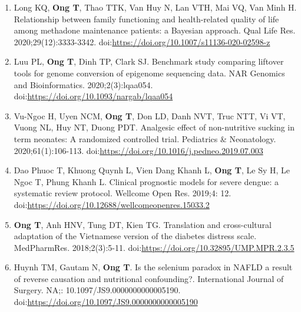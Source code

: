 \documentclass[
  12pt,
  a4paper,
]{article}
\begin{document}
\begin{enumerate}
  doi:\url{https://doi.org/10.2147/DMSO.S297315}
\item
  Long KQ, \textbf{Ong T}, Thao TTK, Van Huy N, Lan VTH, Mai VQ, Van
  Minh H. Relationship between family functioning and health-related
  quality of life among methadone maintenance patients: a Bayesian
  approach. Qual Life Res. 2020;29(12):3333-3342.
  doi:\url{https://doi.org/10.1007/s11136-020-02598-z}
\item
  Luu PL, \textbf{Ong T}, Dinh TP, Clark SJ. Benchmark study comparing
  liftover tools for genome conversion of epigenome sequencing data. NAR
  Genomics and Bioinformatics. 2020;2(3):lqaa054.
  doi:\url{https://doi.org/10.1093/nargab/lqaa054}
\item
  Vu-Ngoc H, Uyen NCM, \textbf{Ong T}, Don LD, Danh NVT, Truc NTT, Vi
  VT, Vuong NL, Huy NT, Duong PDT. Analgesic effect of non-nutritive
  sucking in term neonates: A randomized controlled trial. Pediatrics \&
  Neonatology. 2020;61(1):106-113.
  doi:\url{https://doi.org/10.1016/j.pedneo.2019.07.003}
\item
  Dao Phuoc T, Khuong Quynh L, Vien Dang Khanh L, \textbf{Ong T}, Le Sy
  H, Le Ngoc T, Phung Khanh L. Clinical prognostic models for severe
  dengue: a systematic review protocol. Wellcome Open Res. 2019;4: 12.
  doi:\url{https://doi.org/10.12688/wellcomeopenres.15033.2}
\item
  \textbf{Ong T}, Anh HNV, Tung DT, Kien TG. Translation and
  cross-cultural adaptation of the Vietnamese version of the diabetes
  distress scale. MedPharmRes. 2018;2(3):5-11.
  doi:\url{https://doi.org/10.32895/UMP.MPR.2.3.5}
\item
  Huynh TM, Gautam N, \textbf{Ong T}. Is the selenium paradox in NAFLD a
  result of reverse causation and nutritional confounding?.
  International Journal of Surgery. NA;: 10.1097/JS9.0000000000005190.
  doi:\url{https://doi.org/10.1097/JS9.0000000000005190}
\end{enumerate}
\end{document}
